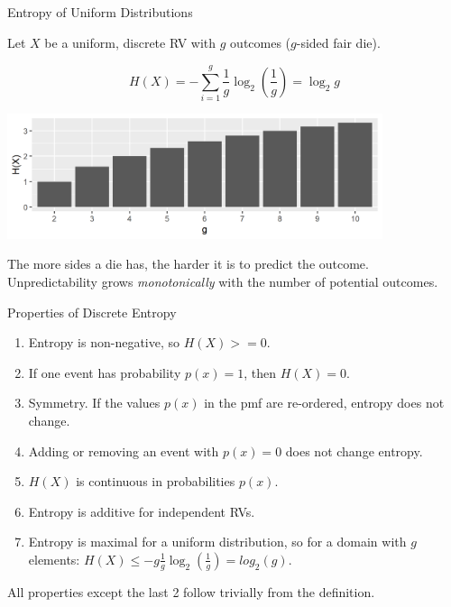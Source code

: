 \begin{vbframe}{Entropy of Uniform Distributions}

Let $X$ be a uniform, discrete RV with $g$ outcomes ($g$-sided fair die).

$$H(X) = - \sum_{i=1}^g \frac{1}{g} \log_2 \left(\frac{1}{g}\right) = \log_2 g$$

\vspace{0.2cm}
\begin{center}
\includegraphics[width = 11cm ]{figure/entropy_uniform_plot.png} \\
\end{center}

The more sides a die has, the harder it is to predict the outcome. 
Unpredictability grows \textit{monotonically} with the number of potential outcomes.
\end{vbframe}

\begin{vbframe}{Properties of Discrete Entropy}
  \begin{enumerate}
    \item Entropy is non-negative, so $H(X) >= 0$.
    \item If one event has probability $p(x) = 1$, then $H(X)=0$. 
    \item Symmetry. If the values $p(x)$ in the pmf are re-ordered, entropy does not change.
    \item Adding or removing an event with $p(x)=0$ does not change entropy.
    \item $H(X)$ is continuous in probabilities $p(x)$.
    \item Entropy is additive for independent RVs.
    \item Entropy is maximal for a uniform distribution, so for a domain with $g$ elements:  
      $H(X) \leq -g\frac{1}{g} \log_2(\frac{1}{g}) = log_2(g)$.
  \end{enumerate}
\lz
All properties except the last 2 follow trivially from the definition.
\end{vbframe}

